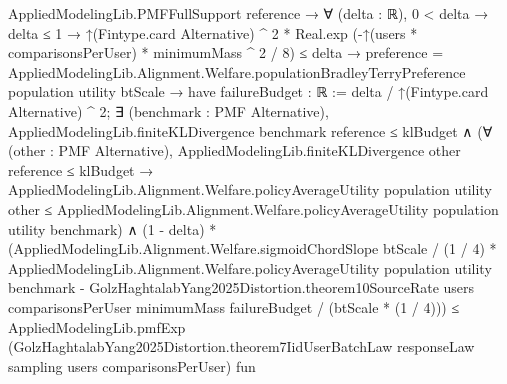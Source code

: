 \documentclass[10pt]{article}
\begin{document}
\begin{ReviewVerbatim}
                            AppliedModelingLib.PMFFullSupport reference →
                              ∀ (delta : ℝ),
                                0 < delta →
                                  delta ≤ 1 →
                                    ↑(Fintype.card Alternative) ^ 2 *
                                          Real.exp (-↑(users * comparisonsPerUser) * minimumMass ^ 2 / 8) ≤
                                        delta →
                                      preference =
                                          AppliedModelingLib.Alignment.Welfare.populationBradleyTerryPreference
                                            population utility btScale →
                                        have failureBudget : ℝ := delta / ↑(Fintype.card Alternative) ^ 2;
                                        ∃ (benchmark : PMF Alternative),
                                          AppliedModelingLib.finiteKLDivergence benchmark reference ≤ klBudget ∧
                                            (∀ (other : PMF Alternative),
                                                AppliedModelingLib.finiteKLDivergence other reference ≤ klBudget →
                                                  AppliedModelingLib.Alignment.Welfare.policyAverageUtility population
                                                      utility other ≤
                                                    AppliedModelingLib.Alignment.Welfare.policyAverageUtility population
                                                      utility benchmark) ∧
                                              (1 - delta) *
                                                  (AppliedModelingLib.Alignment.Welfare.sigmoidChordSlope btScale /
                                                        (1 / 4) *
                                                      AppliedModelingLib.Alignment.Welfare.policyAverageUtility
                                                        population utility benchmark -
                                                    GolzHaghtalabYang2025Distortion.theorem10SourceRate users
                                                        comparisonsPerUser minimumMass failureBudget /
                                                      (btScale * (1 / 4))) ≤
                                                AppliedModelingLib.pmfExp
                                                  (GolzHaghtalabYang2025Distortion.theorem7IidUserBatchLaw responseLaw
                                                    sampling users comparisonsPerUser)
                                                  fun

\end{ReviewVerbatim}
\end{document}
